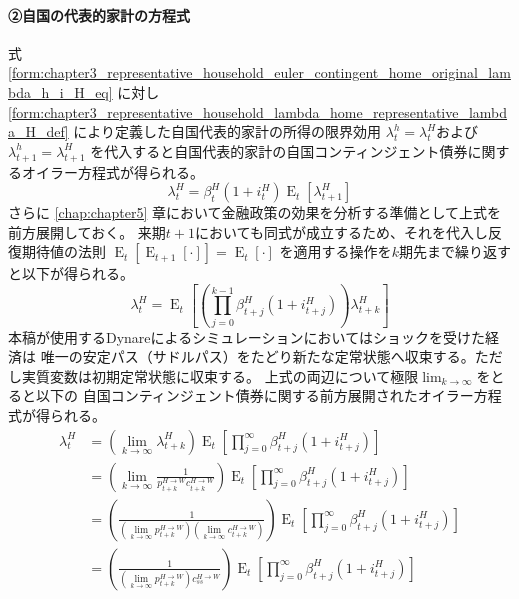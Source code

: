 \paragraph{②自国の代表的家計の方程式}
\label{sec:chapter3_representative_household_euler_contingent_home_representative}
式
\eqref{form:chapter3_representative_household_euler_contingent_home_original_lambda_h_i_H_eq}
に対し
\eqref{form:chapter3_representative_household_lambda_home_representative_lambda_H_def}
により定義した自国代表的家計の所得の限界効用
\(\lambda_t^h=\lambda_t^H\)および
\(\lambda_{t+1}^h=\lambda_{t+1}^H\)
を代入すると自国代表的家計の自国コンティンジェント債券に関するオイラー方程式が得られる。
\begin{equation}
\label{form:chapter3_representative_household_euler_contingent_home_representative_lambda_H_i_H_eq}
    \lambda_t^H=\beta_t^H(1+i_t^H)\operatorname{E}_t[\lambda_{t+1}^H]
\end{equation}
さらに
\ref{chap:chapter5}
章において金融政策の効果を分析する準備として上式を前方展開しておく。
来期\(t+1\)においても同式が成立するため、それを代入し反復期待値の法則
\(\operatorname{E}_t[\operatorname{E}_{t+1}[\cdot]]=\operatorname{E}_t[\cdot]\)
を適用する操作を\(k\)期先まで繰り返すと以下が得られる。
\begin{equation}
\label{form:chapter3_representative_household_euler_contingent_home_representative_lambda_H_i_H_forward_eq}
    \lambda_t^H
    =\operatorname{E}_t\left[\left(\prod_{j=0}^{k-1}\beta_{t+j}^H(1+i_{t+j}^H)\right)\lambda_{t+k}^H\right]
\end{equation}
本稿が使用するDynareによるシミュレーションにおいてはショックを受けた経済は
唯一の安定パス（サドルパス）をたどり新たな定常状態へ収束する。ただし実質変数は初期定常状態に収束する。
上式の両辺について極限\(\lim_{k\to\infty}\)をとると以下の
自国コンティンジェント債券に関する前方展開されたオイラー方程式が得られる。
\begin{equation}
\label{form:chapter3_representative_household_euler_contingent_home_representative_lambda_H_i_H_lim_eq}
    \begin{aligned}
        \lambda_t^H
        &=(\lim_{k\to\infty}\lambda_{t+k}^H)\operatorname{E}_t\left[\prod_{j=0}^{\infty}\beta_{t+j}^H(1+i_{t+j}^H)\right] \\
        &=(\lim_{k\to\infty}\frac{1}{p_{t+k}^{H\to W}c_{t+k}^{H\to W}})\operatorname{E}_t\left[\prod_{j=0}^{\infty}\beta_{t+j}^H(1+i_{t+j}^H)\right] \\
        &=(\frac{1}{(\lim_{k\to\infty}p_{t+k}^{H\to W})(\lim_{k\to\infty}c_{t+k}^{H\to W})})\operatorname{E}_t\left[\prod_{j=0}^{\infty}\beta_{t+j}^H(1+i_{t+j}^H)\right] \\
        &=(\frac{1}{(\lim_{k\to\infty}p_{t+k}^{H\to W})c_{ss}^{H\to W}})\operatorname{E}_t\left[\prod_{j=0}^{\infty}\beta_{t+j}^H(1+i_{t+j}^H)\right]
    \end{aligned}
\end{equation}

